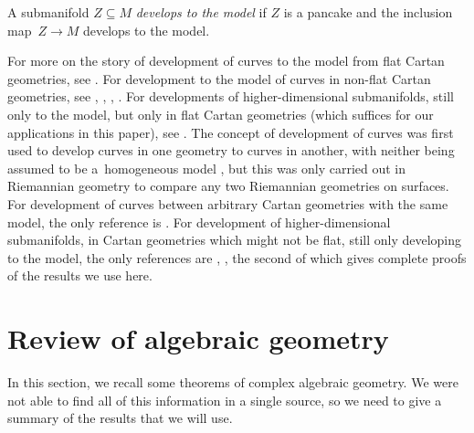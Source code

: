 \documentclass[pdftex]{sigma}
\numberwithin{equation}{section}
\begin{document}
A submanifold $Z\subseteq M$ \emph{develops to the model} if $Z$ is a pancake and the inclusion map~${Z\!\to\! M}$ develops to the model.

For more on the story of development of curves to the model from flat Cartan geometries, see \cite[p.~3]{Goldman:2010}. For development to the model of curves in non-flat Cartan geometries, see
\cite[p.~108, 1.5.17]{Cap/Slovak:2009}, \cite[p.~54, 41X]{Cartan1935}, \cite{Ehresmann:1951}, \cite[p.~368]{Sharpe:1997}. For developments of higher-dimensional submanifolds, still only to the model, but only
in flat Cartan geometries (which suffices for our applications in this paper), see
\cite[Section~4]{KobayashiOchiai:1980}. The concept of development of curves was first used to develop
curves in one geometry to curves in another, with neither being assumed to be a~homogeneous model
\cite{Rinow1932}, but this was only carried out in Riemannian geometry to compare any two Riemannian
geometries on surfaces. For development of curves between arbitrary Cartan geometries with the same model,
the only reference is \cite[Section~17]{mckay2023introduction}. For development of higher-dimensional
submanifolds, in Cartan geometries which might not be flat, still only developing to the model, the only
references are \cite[Section~2.3]{Biswas.McKay:2016}, \cite[p.~43]{mckay2023introduction}, the second of
which gives complete proofs of the results we use here.

\section{Review of algebraic geometry}\label{section:algebraic.geometry}
In this section, we recall some theorems of complex algebraic geometry.
We were not able to find all of this information in a single source, so we need to give a summary of the results that we will use.
\end{document}
